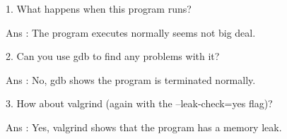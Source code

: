 \documentclass[10pt, answers]{exam}
\begin{document}
\begin{questions}
\begin{solution}
\begin{lstlisting}[language=bash]
    \end{lstlisting}

    1. What happens when this program runs?
    
    Ans : The program executes normally seems not big deal.

    
    2. Can you use gdb to find any problems with it?
    
    Ans : No, gdb shows the program is terminated normally.
    
    
    3. How about valgrind (again with the --leak-check=yes flag)?
    
    Ans : Yes, valgrind shows that the program has a memory leak.
    \end{solution}
    
    
    
    \end{questions}
\end{document}
